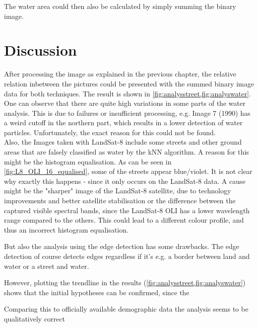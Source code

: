 The water area could then also be calculated by simply summing the binary image.

\section{Discussion}
After processing the image as explained in the previous chapter, the relative relation inbetween the pictures could be presented with the summed binary image data for both techniques. The result is shown in \cref{fig:analysstreet,fig:analyswater}. \\
One can observe that there are quite high variations in some parts of the water analysis. This is due to failures or insufficient processing, e.g. Image 7 (1990) has a weird cutoff in the northern part, which results in a lower detection of water particles. Unfortunately, the exact reason for this could not be found.\\
Also, the Images taken with LandSat-8 include some streets and other ground areas that are falsely classified as water by the kNN algorithm. A reason for this might be the histogram equalisation. As can be seen in \cref{fig:L8_OLI_16_equalised}, some of the streets appear blue/violet. It is not clear why exactly this happens - since it only occurs on the LandSat-8 data. A cause might be the "sharper" image of the LandSat-8 satellite, due to technology improvements and better satellite stabilisation or the difference between the captured visible spectral bands, since the LandSat-8 OLI has a lower wavelength range compared to the others. This could lead to a different colour profile, and thus an incorrect histogram equalisation.

But also the analysis using the edge detection has some drawbacks.
The edge detection of course detects edges regardless if it's e.g. a border between land and water or a street and water.

However, plotting the trendline in the results (\cref{fig:analysstreet,fig:analyswater}) shows that the initial hypotheses can be confirmed, since the



Comparing this to officially available demographic data the analysis seems to be qualitatively correct


\begin{figure}[h!]
\centering
\begin{minipage}{.5\textwidth}
	\centering
	\label{fig:analysstreet}
\end{minipage}%
\begin{minipage}{.5\textwidth}
	\centering
	\label{fig:analyswater}
\end{minipage}
\end{figure}



